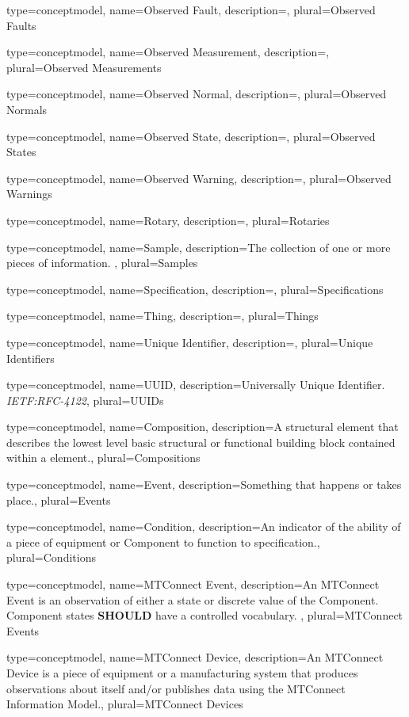 {
	type={conceptmodel},
    name={Observed Fault},
	description={},
	plural={Observed Faults}
}

{
	type={conceptmodel},
    name={Observed Measurement},
	description={},
	plural={Observed Measurements}
}

{
	type={conceptmodel},
    name={Observed Normal},
	description={},
	plural={Observed Normals}
}

{
	type={conceptmodel},
    name={Observed State},
	description={},
	plural={Observed States}
}

{
	type={conceptmodel},
    name={Observed Warning},
	description={},
	plural={Observed Warnings}
}

{
	type={conceptmodel},
    name={Rotary},
	description={},
	plural={Rotaries}
}

{
	type={conceptmodel},
    name={Sample},
	description={The collection of one or more pieces of information.  
},
	plural={Samples}
}

{
	type={conceptmodel},
    name={Specification},
	description={},
	plural={Specifications}
}

{
	type={conceptmodel},
    name={Thing},
	description={},
	plural={Things}
}

{
	type={conceptmodel},
    name={Unique Identifier},
	description={},
	plural={Unique Identifiers}
}

{
	type={conceptmodel},
    name={UUID},
	description={Universally Unique Identifier. \textit{IETF:RFC-4122}},
	plural={UUIDs}
}

{
	type={conceptmodel},
    name={Composition},
	description={A \gls{structural element} that describes the lowest level basic structural or functional building block contained within a  element.},
	plural={Compositions}
}

{
	type={conceptmodel},
    name={Event},
	description={Something that happens or takes place.},
	plural={Events}
}

{
	type={conceptmodel},
    name={Condition},
	description={An indicator of the ability of a piece of equipment or \gls{Component} to function to specification.},
	plural={Conditions}
}

{
	type={conceptmodel},
    name={MTConnect Event},
	description={An \gls{MTConnect Event} is an \gls{observation} of either a state or discrete value of the \gls{Component}. \gls{Component} states \textbf{SHOULD} have a controlled vocabulary.
},
	plural={MTConnect Events}
}

{
	type={conceptmodel},
    name={MTConnect Device},
	description={An \gls{MTConnect Device} is a piece of equipment or a manufacturing system that produces \glspl{observation} about itself and/or publishes data using the \gls{MTConnect Information Model}.},
	plural={MTConnect Devices}
}
